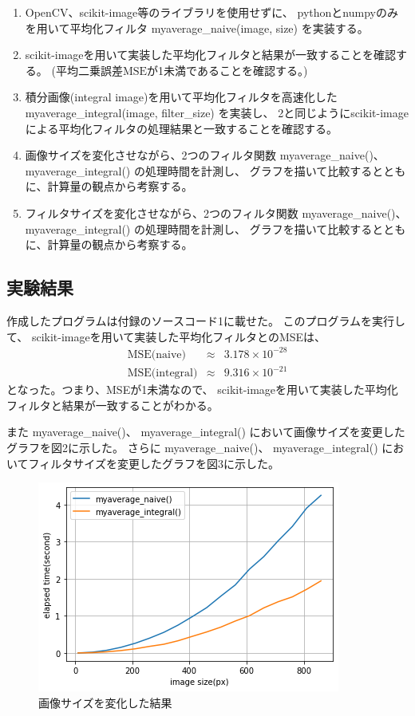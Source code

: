 \documentclass[12pt]{jarticle}
\begin{document}
\begin{enumerate}
    \item OpenCV、scikit-image等のライブラリを使用せずに、
          pythonとnumpyのみを用いて平均化フィルタ myaverage\_naive(image, size) を実装する。

    \item scikit-imageを用いて実装した平均化フィルタと結果が一致することを確認する。
          (平均二乗誤差$\mbox{MSE}$が1未満であることを確認する。)

    \item 積分画像(integral image)を用いて平均化フィルタを高速化した myaverage\_integral(image, filter\_size) を実装し、
          2と同じようにscikit-imageによる平均化フィルタの処理結果と一致することを確認する。

    \item 画像サイズを変化させながら、2つのフィルタ関数 myaverage\_naive()、 myaverage\_integral() の処理時間を計測し、
          グラフを描いて比較するとともに、計算量の観点から考察する。
    \item フィルタサイズを変化させながら、2つのフィルタ関数 myaverage\_naive()、myaverage\_integral() の処理時間を計測し、
          グラフを描いて比較するとともに、計算量の観点から考察する。
\end{enumerate}

\subsection{実験結果}

作成したプログラムは付録のソースコード1に載せた。
このプログラムを実行して、
scikit-imageを用いて実装した平均化フィルタとのMSEは、
\begin{eqnarray*}
    \text{MSE(naive)} &\approx& 3.178 \times 10^{-28} \\
    \text{MSE(integral)} &\approx& 9.316 \times 10^{-21}
\end{eqnarray*}
となった。つまり、MSEが1未満なので、
scikit-imageを用いて実装した平均化フィルタと結果が一致することがわかる。

また myaverage\_naive()、 myaverage\_integral() において画像サイズを変更したグラフを図2に示した。
さらに myaverage\_naive()、 myaverage\_integral() においてフィルタサイズを変更したグラフを図3に示した。
\begin{figure}[h]
    \begin{center}
        \includegraphics[scale=0.7]{kadai4_2_1.png}
    \end{center}
    \caption{画像サイズを変化した結果}
\end{figure}
\end{document}
